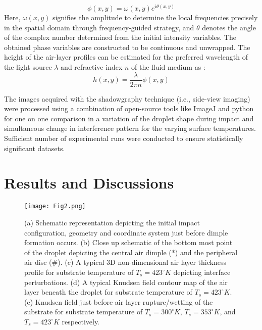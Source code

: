 \documentclass{jfm}
\begin{document}
\begin{equation}
    {\phi}(x,y)={\omega}(x,y)e^{i{\theta}(x,y)}
\end{equation}
Here, ${\omega}(x,y)$ signifies the amplitude to determine the local frequencies precisely in the spatial domain through frequency-guided strategy, and  ${\theta}$ denotes the angle of the complex number determined from the initial intensity variables. The obtained phase variables are constructed to be continuous and unwrapped. The height of the air-layer profiles can be estimated for the preferred wavelength of the light source ${\lambda}$ and refractive index $n$ of the fluid medium as \citep{kitagawa2013thin}:
\begin{equation}
    h(x,y)=\frac{\lambda}{2{\pi}n}{\phi}(x,y)
\end{equation}

The images acquired with the shadowgraphy technique (i.e., side-view imaging) were processed using a combination of open-source tools like ImageJ \citep{schneider2012nih} and python \citep{10.5555/1593511} for one on one comparison in a variation of the droplet shape during impact and simultaneous change in interference pattern for the varying surface temperatures. Sufficient number of experimental runs were conducted to ensure statistically significant datasets.
\section{Results and Discussions}
\begin{figure*}
    \centering
    \texttt{[image: Fig2.png]}
   \caption{(a) Schematic representation depicting the initial impact configuration, geometry and coordinate system just before dimple formation occurs. (b) Close up schematic of the bottom most point of the droplet depicting the central air dimple (*) and the peripheral air disc (\#). (c) A typical 3D non-dimensional air layer thickness profile for substrate temperature of $T_s=423^{\circ}K$ depicting interface perturbations. (d) A typical Knudsen field contour map of the air layer beneath the droplet for substrate temperature of $T_s=423^{\circ}K$. (e) Knudsen field just before air layer rupture/wetting of the substrate for substrate temperature of $T_s=300^{\circ}K$, $T_s=353^{\circ}K$, and $T_s=423^{\circ}K$ respectively.}
    \label{Fig2}
\end{figure*}
\end{document}
